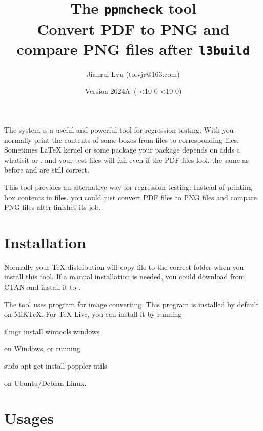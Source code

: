 \documentclass[oneside,12pt]{article}
\newcommand*{\myversion}{2024A}
\newcommand*{\mydate}{Version \myversion\ (\the\year-\mylpad\month-\mylpad\day)}
\newcommand*{\mylpad}[1]{\ifnum#1<10 0\the#1\else\the#1\fi}
\begin{document}
\title{\sffamily
  \textcolor{green3}{The \texttt{ppmcheck} tool}\\
  {\large Convert PDF to PNG and compare PNG files after \texttt{l3build}}%
}
\author{%
  Jianrui Lyu (tolvjr@163.com)%
}
\date{\mydate}
\maketitle

The  system is a useful and powerful tool for regression testing.
With  you normally print the contents of some boxes from  files
to corresponding  files. Sometimes \LaTeX{} kernel or some package your package
depends on adds a whatisit or \mycmd{\kern0pt}, and your test files will fail even if
the PDF files look the same as before and are still correct.

This  tool provides an alternative way for regression testing:
Instead of printing box contents in  files, you could just convert PDF files
to PNG files and compare PNG files after  finishes its job.

\section{Installation}

Normally your TeX distribution will copy  file to the correct folder
when you install this tool. If a manual installation is needed, you could download
\href{https://ctan.org/pkg/ppmcheck}{}
from CTAN and install it to .

The  tool uses  program for image converting.
This program is installed by default on MiKTeX. For TeX Live, you can install it by running
\begin{codehigh}
tlmgr install wintools.windows
\end{codehigh}
on Windows, or running
\begin{codehigh}
sudo apt-get install poppler-utils
\end{codehigh}
on Ubuntu/Debian Linux.

\section{Usages}
\end{document}
